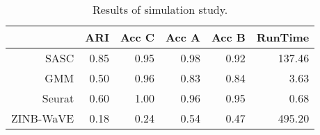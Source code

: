 \begin{table}[ht]
\centering
\begin{tabular}{rrrrrr}
  \hline
 & ARI & Acc C & Acc A & Acc B & RunTime \\ 
  \hline
SASC & 0.85 & 0.95 & 0.98 & 0.92 & 137.46 \\ 
  GMM & 0.50 & 0.96 & 0.83 & 0.84 & 3.63 \\ 
  Seurat & 0.60 & 1.00 & 0.96 & 0.95 & 0.68 \\ 
  ZINB-WaVE & 0.18 & 0.24 & 0.54 & 0.47 & 495.20 \\ 
   \hline
\end{tabular}
\caption{Results of simulation study.} 
\label{table:sim_results}
\end{table}
